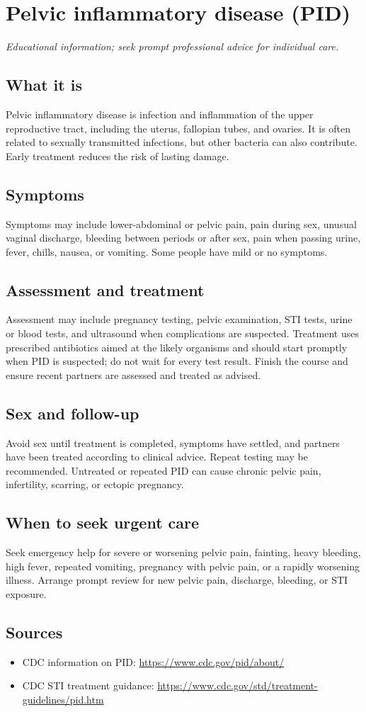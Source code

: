 \chapter{Pelvic inflammatory disease (PID)}

\medskip
\noindent\textit{Educational information; seek prompt professional advice for individual care.}

\section*{What it is}
Pelvic inflammatory disease is infection and inflammation of the upper reproductive tract, including the uterus, fallopian tubes, and ovaries. It is often related to sexually transmitted infections, but other bacteria can also contribute. Early treatment reduces the risk of lasting damage.

\section*{Symptoms}
Symptoms may include lower-abdominal or pelvic pain, pain during sex, unusual vaginal discharge, bleeding between periods or after sex, pain when passing urine, fever, chills, nausea, or vomiting. Some people have mild or no symptoms.

\section*{Assessment and treatment}
Assessment may include pregnancy testing, pelvic examination, STI tests, urine or blood tests, and ultrasound when complications are suspected. Treatment uses prescribed antibiotics aimed at the likely organisms and should start promptly when PID is suspected; do not wait for every test result. Finish the course and ensure recent partners are assessed and treated as advised.

\section*{Sex and follow-up}
Avoid sex until treatment is completed, symptoms have settled, and partners have been treated according to clinical advice. Repeat testing may be recommended. Untreated or repeated PID can cause chronic pelvic pain, infertility, scarring, or ectopic pregnancy.

\section*{When to seek urgent care}
Seek emergency help for severe or worsening pelvic pain, fainting, heavy bleeding, high fever, repeated vomiting, pregnancy with pelvic pain, or a rapidly worsening illness. Arrange prompt review for new pelvic pain, discharge, bleeding, or STI exposure.

\section*{Sources}
\begin{itemize}
\item CDC information on PID: \url{https://www.cdc.gov/pid/about/}
\item CDC STI treatment guidance: \url{https://www.cdc.gov/std/treatment-guidelines/pid.htm}
\end{itemize}
